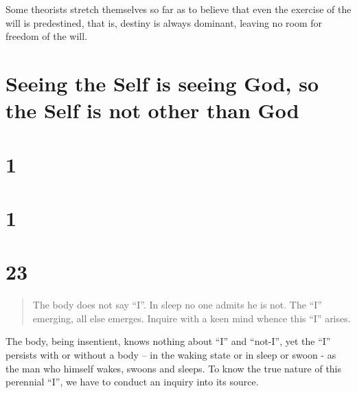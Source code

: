 \documentclass[12pt]{report}
\begin{document}
Some theorists stretch themselves so far as to believe that even the
exercise of the will is predestined, that is, destiny is always
dominant, leaving no room for freedom of the will.

\section{ Seeing the Self is seeing God, so the Self is not other than
God }

\begin{quote}

\end{quote}


\section{1}

\begin{quote}

\end{quote}


\section{1}

\begin{quote}

\end{quote}




\section{23}

\begin{quote}
  The body does not say ``I''. In sleep no one admits he is not. The
  ``I'' emerging, all else emerges. Inquire with a keen mind whence this
  ``I'' arises.
\end{quote}

The body, being insentient, knows nothing about ``I'' and ``not-I'',
yet the ``I'' persists with or without a body -- in the waking state
or in sleep or swoon - as the man who himself wakes, swoons and
sleeps. To know the true nature of this perennial ``I'', we have to
conduct an inquiry into its source.
\end{document}
